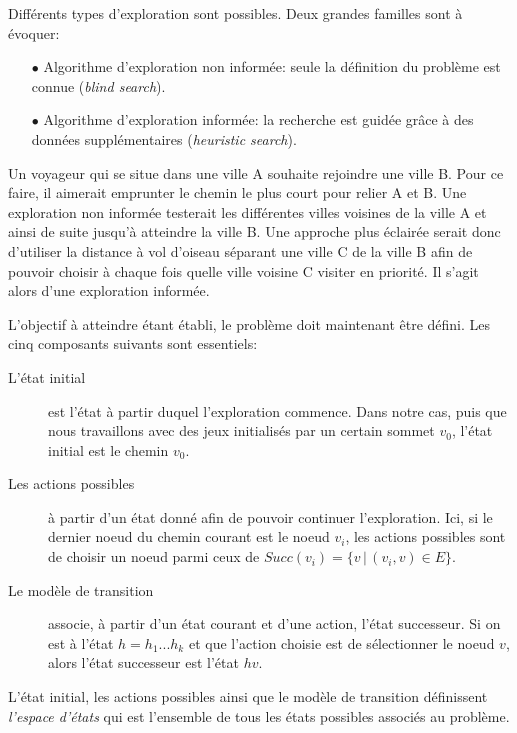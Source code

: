 Différents types d'exploration sont possibles. Deux grandes familles sont à évoquer:

\begin{itemize}
	\item[$\bullet$] Algorithme d'exploration non informée: seule la définition du problème est connue (\emph{blind search}).
	\item[$\bullet$] Algorithme d'exploration informée: la recherche est guidée grâce à des données supplémentaires (\emph{heuristic search}).
\end{itemize}

\begin{exemple}
	Un voyageur qui se situe dans une ville A souhaite rejoindre une ville B. Pour ce faire, il aimerait emprunter le chemin le plus court pour relier A et B. Une exploration non informée testerait les différentes villes voisines de la ville A et ainsi de suite jusqu'à atteindre la ville B. Une approche plus éclairée serait donc d'utiliser la distance à vol d'oiseau séparant une ville C de la ville B afin de pouvoir choisir à chaque fois quelle ville voisine C visiter en priorité. Il s'agit alors d'une exploration informée.
\end{exemple}

L'objectif à atteindre étant établi, le problème doit maintenant être défini. Les cinq composants suivants sont essentiels:

\begin{description}
	\item[L'état initial] est l'état à partir duquel l'exploration commence. Dans notre cas, puis que nous travaillons avec des jeux initialisés par un certain sommet $v_0$, l'état initial est le chemin $v_0$.
	\item[Les actions possibles] à partir d'un état donné afin de pouvoir continuer l'exploration. Ici, si le dernier noeud du chemin courant est le noeud $v_i$, les actions possibles sont de choisir un noeud parmi ceux de $Succ(v_i) = \{ v\, |\, (v_i, v) \in E \}.$
	\item[Le modèle de transition] associe, à partir d'un état courant et d'une action, l'état successeur. Si on est à l'état $h = h_1 ... h_k$ et que l'action choisie est de sélectionner le noeud $v$, alors l'état successeur est l'état $hv$.
\end{description}

L'état initial, les actions possibles ainsi que le modèle de transition définissent \emph{l'espace d'états} qui est l'ensemble de tous les états possibles associés au problème.

